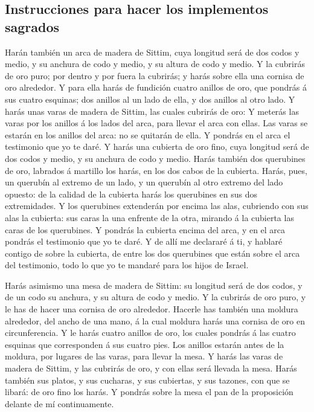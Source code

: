 \hypertarget{instrucciones-para-hacer-los-implementos-sagrados}{%
\subsection{Instrucciones para hacer los implementos
sagrados}\label{instrucciones-para-hacer-los-implementos-sagrados}}

 Harán también un arca de madera de Sittim, cuya longitud
será de dos codos y medio, y su anchura de codo y medio, y su altura de
codo y medio.  Y la cubrirás de oro puro; por dentro y
por fuera la cubrirás; y harás sobre ella una cornisa de oro alrededor.
 Y para ella harás de fundición cuatro anillos de oro,
que pondrás á sus cuatro esquinas; dos anillos al un lado de ella, y dos
anillos al otro lado.  Y harás unas varas de madera de
Sittim, las cuales cubrirás de oro:  Y meterás las varas
por los anillos á los lados del arca, para llevar el arca con ellas.
 Las varas se estarán en los anillos del arca: no se
quitarán de ella.  Y pondrás en el arca el testimonio que
yo te daré.  Y harás una cubierta de oro fino, cuya
longitud será de dos codos y medio, y su anchura de codo y medio.
 Harás también dos querubines de oro, labrados á martillo
los harás, en los dos cabos de la cubierta.  Harás, pues,
un querubín al extremo de un lado, y un querubín al otro extremo del
lado opuesto: de la calidad de la cubierta harás los querubines en sus
dos extremidades.  Y los querubines extenderán por encima
las alas, cubriendo con sus alas la cubierta: sus caras la una enfrente
de la otra, mirando á la cubierta las caras de los querubines.
 Y pondrás la cubierta encima del arca, y en el arca
pondrás el testimonio que yo te daré.  Y de allí me
declararé á ti, y hablaré contigo de sobre la cubierta, de entre los dos
querubines que están sobre el arca del testimonio, todo lo que yo te
mandaré para los hijos de Israel.

 Harás asimismo una mesa de madera de Sittim: su longitud
será de dos codos, y de un codo su anchura, y su altura de codo y medio.
 Y la cubrirás de oro puro, y le has de hacer una cornisa
de oro alrededor.  Hacerle has también una moldura
alrededor, del ancho de una mano, á la cual moldura harás una cornisa de
oro en circunferencia.  Y le harás cuatro anillos de oro,
los cuales pondrás á las cuatro esquinas que corresponden á sus cuatro
pies.  Los anillos estarán antes de la moldura, por
lugares de las varas, para llevar la mesa.  Y harás las
varas de madera de Sittim, y las cubrirás de oro, y con ellas será
llevada la mesa.  Harás también sus platos, y sus
cucharas, y sus cubiertas, y sus tazones, con que se libará: de oro fino
los harás.  Y pondrás sobre la mesa el pan de la
proposición delante de mí continuamente.

